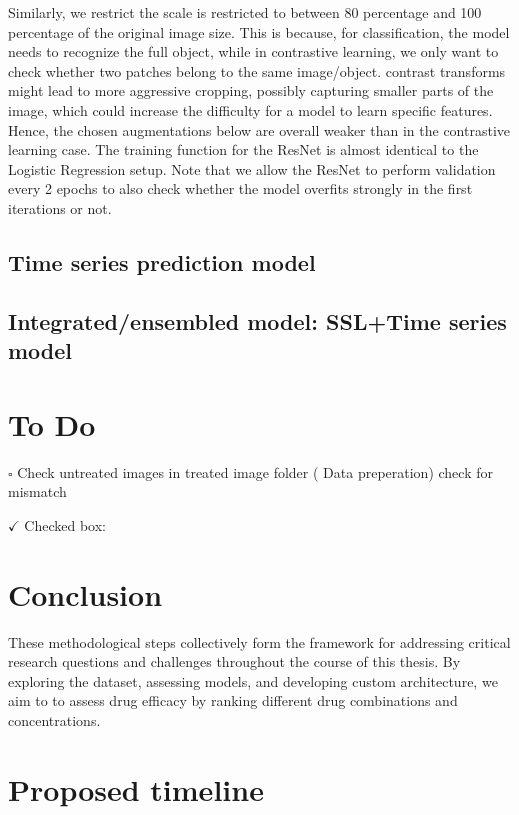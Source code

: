\documentclass[12pt,twoside,a4paper,parskip]{scrbook} %
\begin{document}
Similarly, we restrict  the scale is restricted to between 80 percentage and 100 percentage of the original image size. This is because, for classification, the model needs to recognize the full object, while in contrastive learning, we only want to check whether two patches belong to the same image/object. contrast transforms might lead to more aggressive cropping, possibly capturing smaller parts of the image, which could increase the difficulty for a model to learn specific features. Hence, the chosen augmentations below are overall weaker than in the contrastive learning case.
The training function for the ResNet is almost identical to the Logistic Regression setup. Note that we allow the ResNet to perform validation every 2 epochs to also check whether the model overfits strongly in the first iterations or not.
\section{Time series prediction model}
\section{Integrated/ensembled model: SSL+Time series model}

\chapter{To Do}\label{ch:To Do}
$\square$ Check untreated images in treated image folder ( Data preperation) check for mismatch 

$\checkmark$ Checked box: 
\chapter{Conclusion}\label{ch:Conclusion}

These methodological steps collectively form the framework for addressing critical research questions and challenges throughout the course of this thesis. By exploring the dataset, assessing models, and developing custom architecture, we aim to to assess drug efficacy by ranking different drug combinations and concentrations.

\let\cleardoublepage\clearpage

\chapter{Proposed timeline}\label{ch:Proposed timeline}
\end{document}
